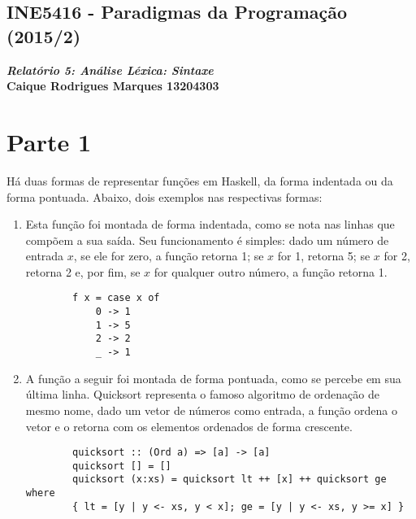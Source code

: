 \documentclass{article}
\begin{document}
\lstset{language=Haskell} %
\begin{center}
    \section*{INE5416 - Paradigmas da Programação (2015/2)}
    \textbf{\textit{Relatório 5: Análise Léxica: Sintaxe} \\
    Caique Rodrigues Marques 13204303}
\end{center}

\section*{Parte 1}
    Há duas formas de representar funções em Haskell, da forma indentada ou da
    forma pontuada. Abaixo, dois exemplos nas respectivas formas: 
    \begin{enumerate}
        \item Esta função foi montada de forma indentada, como se nota nas
            linhas que compõem a sua saída. Seu funcionamento é simples: dado
            um número de entrada $x$, se ele for zero, a função retorna 1; se
            $x$ for 1, retorna 5; se $x$ for 2, retorna 2 e, por fim, se $x$
            for qualquer outro número, a função retorna 1.
        \begin{lstlisting}
        f x = case x of
            0 -> 1
            1 -> 5
            2 -> 2
            _ -> 1
        \end{lstlisting}
        
        \item A função a seguir foi montada de forma pontuada, como se percebe
            em sua última linha. Quicksort representa o famoso algoritmo de
            ordenação de mesmo nome, dado um vetor de números como entrada, a
            função ordena o vetor e o retorna com os elementos ordenados de
            forma crescente. 
        \begin{lstlisting}
        quicksort :: (Ord a) => [a] -> [a]
        quicksort [] = []
        quicksort (x:xs) = quicksort lt ++ [x] ++ quicksort ge where 
        { lt = [y | y <- xs, y < x]; ge = [y | y <- xs, y >= x] }
        \end{lstlisting}
    \end{enumerate}
    
\end{document}
